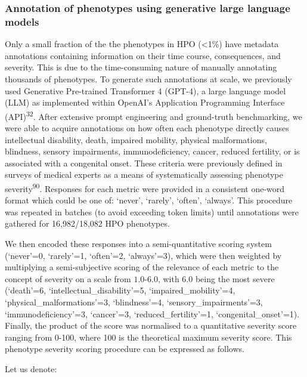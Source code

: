 \documentclass[
]{article}
\begin{document}
\subsubsection{Annotation of phenotypes using generative large language
models}\label{annotation-of-phenotypes-using-generative-large-language-models-1}

Only a small fraction of the the phenotypes in HPO (\textless1\%) have
metadata annotations containing information on their time course,
consequences, and severity. This is due to the time-consuming nature of
manually annotating thousands of phenotypes. To generate such
annotations at scale, we previously used Generative Pre-trained
Transformer 4 (GPT-4), a large language model (LLM) as implemented
within OpenAI's Application Programming Interface
(API)\textsuperscript{32}. After extensive prompt engineering and
ground-truth benchmarking, we were able to acquire annotations on how
often each phenotype directly causes intellectual disability, death,
impaired mobility, physical malformations, blindness, sensory
impairments, immunodeficiency, cancer, reduced fertility, or is
associated with a congenital onset. These criteria were previously
defined in surveys of medical experts as a means of systematically
assessing phenotype severity\textsuperscript{90}. Responses for each
metric were provided in a consistent one-word format which could be one
of: `never', `rarely', `often', `always'. This procedure was repeated in
batches (to avoid exceeding token limits) until annotations were
gathered for 16,982/18,082 HPO phenotypes.

We then encoded these responses into a semi-quantitative scoring system
(`never'=0, `rarely'=1, `often'=2, `always'=3), which were then weighted
by multiplying a semi-subjective scoring of the relevance of each metric
to the concept of severity on a scale from \(1.0\)-\(6.0\), with \(6.0\)
being the most severe (`death'=6, `intellectual\_disability'=5,
`impaired\_mobility'=4, `physical\_malformations'=3, `blindness'=4,
`sensory\_impairments'=3, `immunodeficiency'=3, `cancer'=3,
`reduced\_fertility'=1, `congenital\_onset'=1). Finally, the product of
the score was normalised to a quantitative severity score ranging from
0-100, where 100 is the theoretical maximum severity score. This
phenotype severity scoring procedure can be expressed as follows.

Let us denote:
\end{document}
